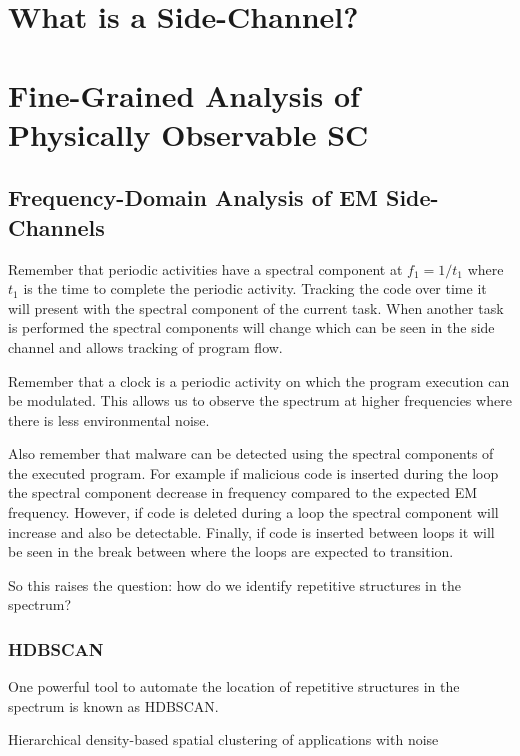 \graphicspath{ {./chapters/Side_Channels} }

\section{What is a Side-Channel?}

\section{Fine-Grained Analysis of Physically Observable SC}
  \subsection{Frequency-Domain Analysis of EM Side-Channels}
    Remember that periodic activities have a spectral component at $f_1 = 1/t_1$ where $t_1$ is the time to complete the periodic activity.
    Tracking the code over time it will present with the spectral component of the current task.
    When another task is performed the spectral components will change which can be seen in the side channel and allows tracking of program flow.

    Remember that a clock is a periodic activity on which the program execution can be modulated.
    This allows us to observe the spectrum at higher frequencies where there is less environmental noise.

    Also remember that malware can be detected using the spectral components of the executed program.
    For example if malicious code is inserted during the loop the spectral component decrease in frequency compared to the expected EM frequency.
    However, if code is deleted during a loop the spectral component will increase and also be detectable.
    Finally, if code is inserted between loops it will be seen in the break between where the loops are expected to transition.

    So this raises the question: how do we identify repetitive structures in the spectrum?

    \subsubsection{HDBSCAN}

      One powerful tool to automate the location of repetitive structures in the spectrum is known as HDBSCAN.

      \begin{defbox}[HDBSCAN]
        Hierarchical density-based spatial clustering of applications with noise
      \end{defbox}

